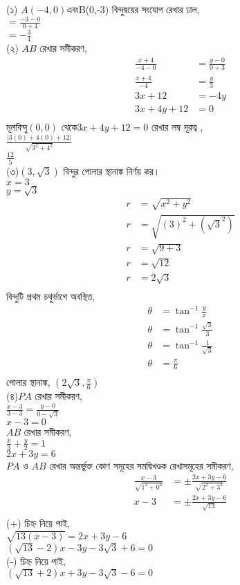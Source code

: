 \documentclass{article}
\begin{document}
 
(১) $A(-4,0)$এবংB(0,-3) বিন্দুদ্বয়ের সংযোগ রেখার ঢাল,\\
$=\frac{-3-0}{0+4}$\\
 $=-\frac{3}{4}$\\
 (২) $AB$ রেখার সমীকরণ,\\
 \begin{align*}
 	\frac{x+4}{-4-0}&=\frac{y-0}{0+3}\\
 	\frac{x+4}{-4}&=\frac{y}{3}\\
 	3x+12&=-4y\\
 	3x+4y+12&=0\\
 \end{align*}
 মূলবিন্দু$(0,0)$ থেকে$3x+4y+12=0$ রেখার লম্ব দূরত্ব ,\\
 $\frac{|3(0)+4(0)+12|}{\sqrt{3^2+4^2}}$\\
 $\frac{12}{5}$\\
(৩)$(3,\sqrt{3})$ বিন্দুর পোলার স্থানাঙ্ক নির্ণয় কর।\\
$x=3$\\
$y=\sqrt{3}$\\
\begin{align*}
	r&=\sqrt{x^2+y^2}\\
	r&=\sqrt{(3)^2+(\sqrt{3}^2)}\\
	r&=\sqrt{9+3}\\
	r&=\sqrt{12}\\
	r&=2\sqrt{3}\\
\end{align*}
 বিন্দুটি প্রথম চথুর্ভাগে অবস্থিত,\\
 \begin{align*}
 	\theta&=\tan^{-1}\frac{y}{x}\\
 	\theta&=\tan^{-1}\frac{\sqrt{3}}{3}\\
 	\theta&=\tan^{-1}\frac{1}{\sqrt{3}}\\
 	\theta&=\frac{\pi}{6}\\
 \end{align*}
 পোলার স্থানাঙ্ক, $(2\sqrt{3},\frac{\pi}{6})$\\
(৪)$PA$ রেখার সমীকরণ,\\
$\frac{x-3}{3-3}=\frac{y-0}{0-\sqrt{3}}$\\
$x-3=0$\\
$AB$ রেখার সমীকরণ,\\
$\frac{x}{3}+\frac{y}{2}=1$\\
$2x+3y=6$\\
$PA$ ও $AB$ রেখার অন্তর্ভুক্ত কোণ সমূহের সমদ্বিখণ্ডক রেখাসমূহের সমীকরণ,\\
\begin{align*}
	\frac{x-3}{\sqrt{1^2+0^2}}&=\pm\frac{2x+3y-6}{\sqrt{2^2+3^2}}\\
	x-3&=\pm\frac{2x+3y-6}{\sqrt{13}}\\
\end{align*}
(+) চিহ্ন  নিয়ে পাই,\\
$\sqrt{13(x-3)}=2x+3y-6$\\
$(\sqrt{13}-2)x-3y-3\sqrt{3}+6=0$\\
(-) চিহ্ন নিয়ে পাই,\\
$(\sqrt{13}+2)x+3y-3\sqrt{3}-6=0$\\
\end{document}
